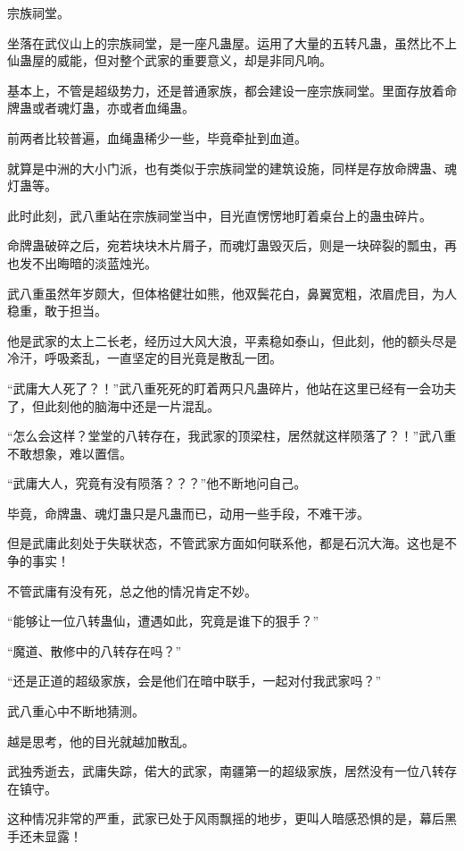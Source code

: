 
\begin{this_body}

宗族祠堂。

坐落在武仪山上的宗族祠堂，是一座凡蛊屋。运用了大量的五转凡蛊，虽然比不上仙蛊屋的威能，但对整个武家的重要意义，却是非同凡响。

基本上，不管是超级势力，还是普通家族，都会建设一座宗族祠堂。里面存放着命牌蛊或者魂灯蛊，亦或者血绳蛊。

前两者比较普遍，血绳蛊稀少一些，毕竟牵扯到血道。

就算是中洲的大小门派，也有类似于宗族祠堂的建筑设施，同样是存放命牌蛊、魂灯蛊等。

此时此刻，武八重站在宗族祠堂当中，目光直愣愣地盯着桌台上的蛊虫碎片。

命牌蛊破碎之后，宛若块块木片屑子，而魂灯蛊毁灭后，则是一块碎裂的瓢虫，再也发不出晦暗的淡蓝烛光。

武八重虽然年岁颇大，但体格健壮如熊，他双鬓花白，鼻翼宽粗，浓眉虎目，为人稳重，敢于担当。

他是武家的太上二长老，经历过大风大浪，平素稳如泰山，但此刻，他的额头尽是冷汗，呼吸紊乱，一直坚定的目光竟是散乱一团。

“武庸大人死了？！”武八重死死的盯着两只凡蛊碎片，他站在这里已经有一会功夫了，但此刻他的脑海中还是一片混乱。

“怎么会这样？堂堂的八转存在，我武家的顶梁柱，居然就这样陨落了？！”武八重不敢想象，难以置信。

“武庸大人，究竟有没有陨落？？？”他不断地问自己。

毕竟，命牌蛊、魂灯蛊只是凡蛊而已，动用一些手段，不难干涉。

但是武庸此刻处于失联状态，不管武家方面如何联系他，都是石沉大海。这也是不争的事实！

不管武庸有没有死，总之他的情况肯定不妙。

“能够让一位八转蛊仙，遭遇如此，究竟是谁下的狠手？”

“魔道、散修中的八转存在吗？”

“还是正道的超级家族，会是他们在暗中联手，一起对付我武家吗？”

武八重心中不断地猜测。

越是思考，他的目光就越加散乱。

武独秀逝去，武庸失踪，偌大的武家，南疆第一的超级家族，居然没有一位八转存在镇守。

这种情况非常的严重，武家已处于风雨飘摇的地步，更叫人暗感恐惧的是，幕后黑手还未显露！


\end{this_body}
